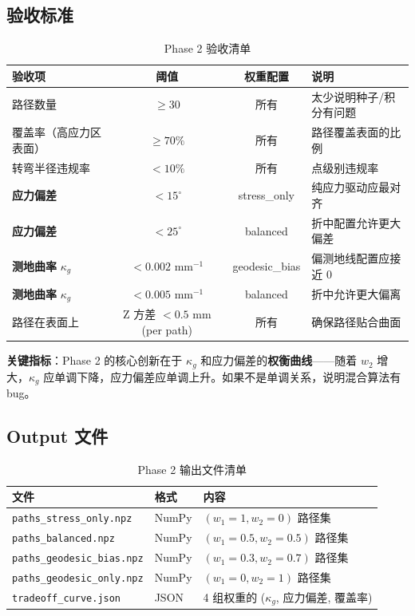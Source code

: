 \documentclass[11pt,a4paper]{article}
\begin{document}
\subsection{验收标准}

\begin{table}[H]
\centering
\begin{tabularx}{\textwidth}{X c c l}
\toprule
\textbf{验收项} & \textbf{阈值} & \textbf{权重配置} & \textbf{说明} \\
\midrule
路径数量 & $\geq 30$ & 所有 & 太少说明种子/积分有问题 \\
覆盖率（高应力区表面）& $\geq 70\%$ & 所有 & 路径覆盖表面的比例 \\
转弯半径违规率 & $< 10\%$ & 所有 & 点级别违规率 \\
\textbf{应力偏差} & $< 15^\circ$ & stress\_only & 纯应力驱动应最对齐 \\
\textbf{应力偏差} & $< 25^\circ$ & balanced & 折中配置允许更大偏差 \\
\textbf{测地曲率} $\kappa_g$ & $< 0.002$ mm$^{-1}$ & geodesic\_bias & 偏测地线配置应接近 0 \\
\textbf{测地曲率} $\kappa_g$ & $< 0.005$ mm$^{-1}$ & balanced & 折中允许更大偏离 \\
路径在表面上 & Z 方差 $< 0.5$ mm (per path) & 所有 & 确保路径贴合曲面 \\
\bottomrule
\end{tabularx}
\caption{Phase 2 验收清单}
\end{table}

\textcolor{accent}{\textbf{关键指标}}：Phase 2 的核心创新在于 $\kappa_g$ 和应力偏差的\textbf{权衡曲线}——随着 $w_2$ 增大，$\kappa_g$ 应单调下降，应力偏差应单调上升。如果不是单调关系，说明混合算法有 bug。

\subsection{Output 文件}

\begin{table}[H]
\centering
\begin{tabular}{l l l}
\toprule
\textbf{文件} & \textbf{格式} & \textbf{内容} \\
\midrule
\texttt{paths\_stress\_only.npz} & NumPy & $(w_1=1, w_2=0)$ 路径集 \\
\texttt{paths\_balanced.npz} & NumPy & $(w_1=0.5, w_2=0.5)$ 路径集 \\
\texttt{paths\_geodesic\_bias.npz} & NumPy & $(w_1=0.3, w_2=0.7)$ 路径集 \\
\texttt{paths\_geodesic\_only.npz} & NumPy & $(w_1=0, w_2=1)$ 路径集 \\
\texttt{tradeoff\_curve.json} & JSON & 4 组权重的 ($\kappa_g$, 应力偏差, 覆盖率) \\
\bottomrule
\end{tabular}
\caption{Phase 2 输出文件清单}
\end{table}
\end{document}
